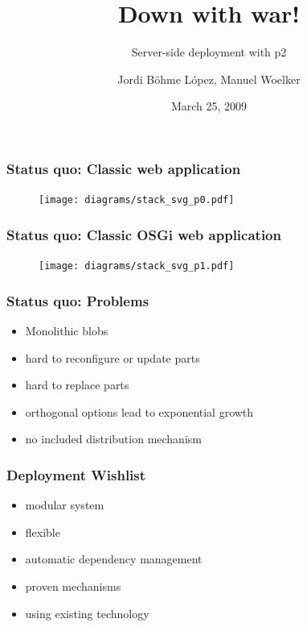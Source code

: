 \documentclass{beamer}
\author[Jordi Böhme López, Manuel Woelker]{Jordi Böhme López, Manuel Woelker}
\title[Down with war!\hspace{2em}\insertframenumber/\inserttotalframenumber]{Down with war!}
\subtitle{Server-side deployment with p2}
\date{March 25, 2009} %
\begin{document}
\maketitle


\begin{frame}
  \frametitle{Status quo: Classic web application}
\begin{figure}
   \texttt{[image: diagrams/stack\_svg\_p0.pdf]}
\end{figure}
\end{frame}

\begin{frame}
  \frametitle{Status quo: Classic OSGi web application}
\begin{figure}
   \texttt{[image: diagrams/stack\_svg\_p1.pdf]}
\end{figure}
\end{frame}

\begin{frame}
  \frametitle{Status quo: Problems}
  \begin{itemize}
  \item Monolithic blobs\pause
  \item hard to reconfigure or update parts\pause
  \item hard to replace parts\pause
  \item orthogonal options lead to exponential growth\pause
  \item no included distribution mechanism
  \end{itemize}   
\end{frame}

\begin{frame}
  \frametitle{Deployment Wishlist}
  \begin{itemize}
  \item modular system\pause
  \item flexible\pause
  \item automatic dependency management\pause
  \item proven mechanisms\pause
  \item using existing technology
  \end{itemize}   
\end{frame}
\end{document}

